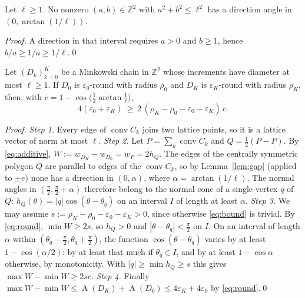 \documentclass[runningheads]{llncs}
\newcommand{\Z}{\mathbb{Z}}
\newcommand{\conv}{\operatorname{conv}}
\newcommand{\A}{\operatorname{A}}
\begin{document}
\begin{lemma}\label{lem:gap}
Let $\ell\ge1$. No nonzero $(a,b)\in\Z^2$ with $a^2+b^2\le \ell^2$ has a direction angle in $(0,\arctan(1/\ell))$.
\end{lemma}
\begin{proof}
A direction in that interval requires $a>0$ and $b\ge1$, hence $b/a\ge1/a\ge1/\ell$.\qed
\end{proof}

\begin{theorem}\label{thm:lower}
Let $(D_k)_{k=0}^K$ be a Minkowski chain in $\Z^2$ whose increments have diameter at most $\ell\ge1$. If $D_0$ is $\varepsilon_0$-round with radius $\rho_0$ and $D_K$ is $\varepsilon_K$-round with radius $\rho_K$, then, with $c=1-\cos\bigl(\frac12\arctan\frac1\ell\bigr)$,
\begin{equation}\label{eq:bound}
4(\varepsilon_0+\varepsilon_K)\ \ge\ 2\,(\rho_K-\rho_0-\varepsilon_0-\varepsilon_K)\,c .
\end{equation}
\end{theorem}
\begin{proof}
\emph{Step 1.} Every edge of $\conv C_k$ joins two lattice points, so it is a lattice vector of norm at most $\ell$.
\emph{Step 2.} Let $P=\sum_k\conv C_k$ and $Q=\frac12(P-P)$. By \eqref{eq:additive}, $W:=w_{D_K}-w_{D_0}=w_P=2h_Q$. The edges of the centrally symmetric polygon $Q$ are parallel to edges of the $\conv C_k$, so by Lemma~\ref{lem:gap} (applied to $\pm e$) none has a direction in $(0,\alpha)$, where $\alpha=\arctan(1/\ell)$. The normal angles in $(\frac\pi2,\frac\pi2+\alpha)$ therefore belong to the normal cone of a single vertex $q$ of $Q$: $h_Q(\theta)=|q|\cos(\theta-\theta_q)$ on an interval $I$ of length at least $\alpha$.
\emph{Step 3.} We may assume $s:=\rho_K-\rho_0-\varepsilon_0-\varepsilon_K>0$, since otherwise \eqref{eq:bound} is trivial. By \eqref{eq:round}, $\min W\ge2s$, so $h_Q>0$ and $|\theta-\theta_q|<\frac\pi2$ on $I$. On an interval of length $\alpha$ within $(\theta_q-\frac\pi2,\theta_q+\frac\pi2)$, the function $\cos(\theta-\theta_q)$ varies by at least $1-\cos(\alpha/2)$: by at least that much if $\theta_q\in I$, and by at least $1-\cos\alpha$ otherwise, by monotonicity. With $|q|\ge\min h_Q\ge s$ this gives $\max W-\min W\ge2sc$.
\emph{Step 4.} Finally $\max W-\min W\le\A(D_K)+\A(D_0)\le4\varepsilon_K+4\varepsilon_0$ by \eqref{eq:round}.\qed
\end{proof}
\end{document}
